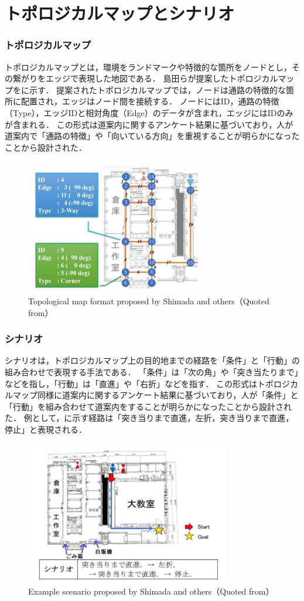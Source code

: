 \section{トポロジカルマップとシナリオ}
\subsubsection{トポロジカルマップ}
トポロジカルマップとは，環境をランドマークや特徴的な箇所をノードとし，その繋がりをエッジで表現した地図である．
島田らが提案したトポロジカルマップをに示す．
提案されたトポロジカルマップでは，ノードは通路の特徴的な箇所に配置され，エッジはノード間を接続する．
ノードにはID，通路の特徴（Type），エッジIDと相対角度（Edge）のデータが含まれ，エッジにはIDのみが含まれる．
この形式は道案内に関するアンケート結果に基づいており，人が道案内で「通路の特徴」や「向いている方向」を重視することが明らかになったことから設計された．

\begin{figure}[htbp]
  \centering
   \includegraphics[width=80mm]{images/pdf/shimada/topo.pdf}
   \caption[Topological map format proposed by Shimada and others]{Topological map format proposed by Shimada and others（Quoted from\cite{shimada2020}）}
   \label{fig:topo}
\end{figure}

\clearpage
\subsubsection{シナリオ}
シナリオは，トポロジカルマップ上の目的地までの経路を「条件」と「行動」の組み合わせで表現する手法である．
「条件」は「次の角」や「突き当たりまで」などを指し，「行動」は「直進」や「右折」などを指す．
この形式はトポロジカルマップ同様に道案内に関するアンケート結果に基づいており，人が「条件」と「行動」を組み合わせて道案内をすることが明らかになったことから設計された．
例として，に示す経路は「突き当りまで直進，左折，突き当りまで直進，停止」と表現される．

\begin{figure}[htbp]
  \centering
   \includegraphics[width=90mm]{images/pdf/shimada/scenario.pdf}
   \caption{Example scenario proposed by Shimada and others（Quoted from\cite{shimada2020}）}
   \label{fig:scenario}
\end{figure}